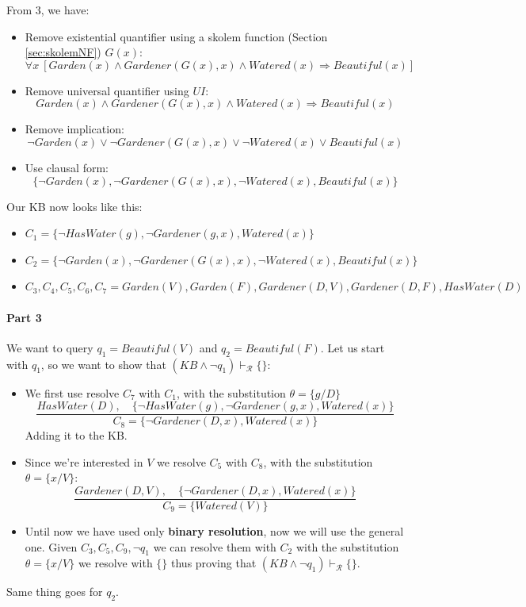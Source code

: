 \documentclass[10pt,a4paper]{article}
\begin{document}
From 3, we have:
\begin{itemize}
\item Remove existential quantifier using a skolem function (Section \ref{sec:skolemNF}) $G(x)$:
\[\forall x\ [Garden(x)\wedge  Gardener(G(x),x) \wedge Watered(x)\Rightarrow Beautiful(x)]\]
\item Remove universal quantifier using $UI$:
\[Garden(x)\wedge  Gardener(G(x),x) \wedge Watered(x)\Rightarrow Beautiful(x)\]
\item Remove implication:
\[\neg Garden(x)\vee \neg Gardener(G(x),x) \vee \neg Watered(x)\vee Beautiful(x)\]
\item Use clausal form:
\[\lbrace \neg Garden(x), \neg Gardener(G(x),x) , \neg Watered(x), Beautiful(x)\rbrace\]
\end{itemize}

Our KB now looks like this:
\begin{itemize}
\item $C_1=\lbrace \neg HasWater(g), \neg Gardener(g,x), Watered(x)\rbrace$
\item $C_2=\lbrace \neg Garden(x), \neg Gardener(G(x),x) , \neg Watered(x), Beautiful(x)\rbrace$
\item $C_3,C_4,C_5,C_6,C_7=Garden(V), Garden(F), Gardener(D,V), Gardener(D,F), HasWater(D)$
\end{itemize}



\paragraph{Part 3}
We want to query $q_1=Beautiful(V)$ and $q_2=Beautiful(F)$. Let us start with $q_1$, so we want to show that $(KB \wedge \neg q_1)\vdash_{\mathcal{R}} \{\}$:
\begin{itemize}
\item We first use resolve $C_7$ with $C_1$, with the substitution $\theta=\{g/D\}$
\[\frac{ HasWater(D),\quad \lbrace \neg HasWater(g), \neg Gardener(g,x), Watered(x)\rbrace}{C_8=\lbrace \neg Gardener(D,x), Watered(x)\rbrace}\]
Adding it to the KB.
\item Since we're interested in $V$ we resolve $C_5$  with $C_8$, with the substitution $\theta=\{x/V\}$:
\[\frac{Gardener(D,V),\quad \lbrace \neg Gardener(D,x), Watered(x)\rbrace}{C_9=\lbrace Watered(V)\rbrace}\]
\item Until now we have used only \textbf{binary resolution}, now we will use the general one. Given $C_3,C_5,C_9,\neg q_1$ we can resolve them with $C_2$ with the substitution $\theta=\{x/V\}$ we resolve with $\{\}$ thus proving that $(KB \wedge \neg q_1)\vdash_{\mathcal{R}} \{\}$.
\end{itemize}
Same thing goes for $q_2$.
\end{document}
